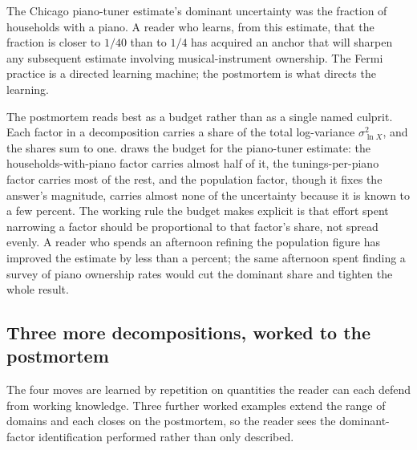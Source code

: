 The Chicago piano-tuner estimate's dominant uncertainty was the
fraction of households with a piano. A reader who learns, from this
estimate, that the fraction is closer to $1/40$ than to $1/4$ has
acquired an anchor that will sharpen any subsequent estimate involving
musical-instrument ownership. The Fermi practice is a directed
learning machine; the postmortem is what directs the learning.

The postmortem reads best as a budget rather than as a single named
culprit. Each factor in a decomposition carries a share of the total
log-variance $\sigma_{\ln X}^{2}$, and the shares sum to one.
 draws the budget for the
piano-tuner estimate: the households-with-piano factor carries almost
half of it, the tunings-per-piano factor carries most of the rest, and
the population factor, though it fixes the answer's magnitude, carries
almost none of the uncertainty because it is known to a few percent.
The working rule the budget makes explicit is that effort spent
narrowing a factor should be proportional to that factor's share, not
spread evenly. A reader who spends an afternoon refining the population
figure has improved the estimate by less than a percent; the same
afternoon spent finding a survey of piano ownership rates would cut the
dominant share and tighten the whole result.



\subsection{Three more decompositions, worked to the postmortem}

The four moves are learned by repetition on quantities the reader can
each defend from working knowledge. Three further worked examples
extend the range of domains and each closes on the postmortem, so the
reader sees the dominant-factor identification performed rather than
only described.

